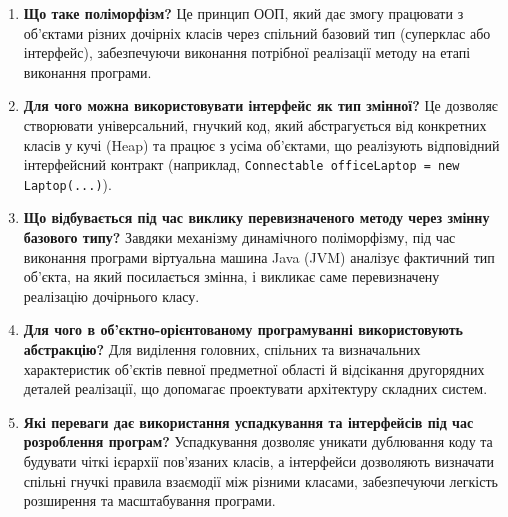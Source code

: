 \begin{enumerate}
    \item \textbf{Що таке поліморфізм?}
    Це принцип ООП, який дає змогу працювати з об'єктами різних дочірніх класів через 
    спільний базовий тип (суперклас або інтерфейс), забезпечуючи виконання потрібної 
    реалізації методу на етапі виконання програми.

    \item \textbf{Для чого можна використовувати інтерфейс як тип змінної?}
    Це дозволяє створювати універсальний, гнучкий код, який абстрагується від конкретних 
    класів у кучі (Heap) та працює з усіма об'єктами, що реалізують відповідний інтерфейсний 
    контракт (наприклад, \texttt{Connectable officeLaptop = new Laptop(...)}).

    \item \textbf{Що відбувається під час виклику перевизначеного методу через змінну базового типу?}
    Завдяки механізму динамічного поліморфізму, під час виконання програми віртуальна машина 
    Java (JVM) аналізує фактичний тип об'єкта, на який посилається змінна, і викликає саме 
    перевизначену реалізацію дочірнього класу.

    \item \textbf{Для чого в об'єктно-орієнтованому програмуванні використовують абстракцію?}
    Для виділення головних, спільних та визначальних характеристик об'єктів певної предметної 
    області й відсікання другорядних деталей реалізації, що допомагає проектувати архітектуру 
    складних систем.

    \item \textbf{Які переваги дає використання успадкування та інтерфейсів під час розроблення програм?}
    Успадкування дозволяє уникати дублювання коду та будувати чіткі ієрархії пов'язаних класів, 
    а інтерфейси дозволяють визначати спільні гнучкі правила взаємодії між різними класами, 
    забезпечуючи легкість розширення та масштабування програми.
\end{enumerate}